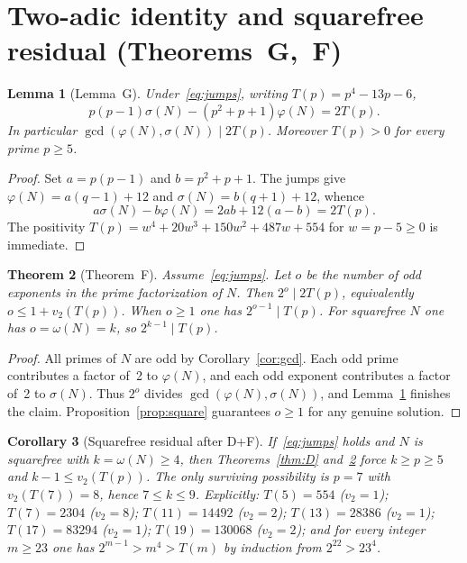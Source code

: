 \documentclass[11pt,reqno]{amsart}
\newcommand{\ph}{\varphi}
\newcommand{\sig}{\sigma}
\newtheorem{theorem}{Theorem}
\newtheorem{lemma}[theorem]{Lemma}
\newtheorem{corollary}[theorem]{Corollary}
\theoremstyle{definition}
\begin{document}
\section{Two-adic identity and squarefree residual (Theorems~G,~F)}
\label{sec:thmF}

\begin{lemma}[Lemma~G]
\label{lem:G}
Under~\eqref{eq:jumps}, writing \(T(p)=p^4-13p-6\),
\[
p(p-1)\sig(N)-(p^2+p+1)\ph(N)=2T(p).
\]
In particular \(\gcd(\ph(N),\sig(N))\mid 2T(p)\). Moreover \(T(p)>0\) for every prime \(p\ge 5\).
\end{lemma}

\begin{proof}
Set \(a=p(p-1)\) and \(b=p^2+p+1\). The jumps give \(\ph(N)=a(q-1)+12\) and \(\sig(N)=b(q+1)+12\), whence
\[
a\sig(N)-b\ph(N)=2ab+12(a-b)=2T(p).
\]
The positivity \(T(p)=w^4+20w^3+150w^2+487w+554\) for \(w=p-5\ge 0\) is immediate.
\end{proof}

\begin{theorem}[Theorem~F]
\label{thm:F}
Assume~\eqref{eq:jumps}. Let \(o\) be the number of odd exponents in the prime factorization of \(N\). Then \(2^o\mid 2T(p)\), equivalently \(o\le 1+v_2(T(p))\). When \(o\ge 1\) one has \(2^{o-1}\mid T(p)\). For squarefree \(N\) one has \(o=\omega(N)=k\), so \(2^{k-1}\mid T(p)\).
\end{theorem}

\begin{proof}
All primes of \(N\) are odd by Corollary~\ref{cor:gcd}. Each odd prime contributes a factor of~2 to \(\ph(N)\), and each odd exponent contributes a factor of~2 to \(\sig(N)\). Thus \(2^o\) divides \(\gcd(\ph(N),\sig(N))\), and Lemma~\ref{lem:G} finishes the claim. Proposition~\ref{prop:square} guarantees \(o\ge 1\) for any genuine solution.
\end{proof}

\begin{corollary}[Squarefree residual after D+F]
\label{cor:F1}
If~\eqref{eq:jumps} holds and \(N\) is squarefree with \(k=\omega(N)\ge 4\), then Theorems~\ref{thm:D} and~\ref{thm:F} force \(k\ge p\ge 5\) and \(k-1\le v_2(T(p))\). The only surviving possibility is \(p=7\) with \(v_2(T(7))=8\), hence \(7\le k\le 9\). Explicitly: \(T(5)=554\) (\(v_2=1\)); \(T(7)=2304\) (\(v_2=8\)); \(T(11)=14492\) (\(v_2=2\)); \(T(13)=28386\) (\(v_2=1\)); \(T(17)=83294\) (\(v_2=1\)); \(T(19)=130068\) (\(v_2=2\)); and for every integer \(m\ge 23\) one has \(2^{m-1}>m^4>T(m)\) by induction from \(2^{22}>23^4\).
\end{corollary}
\end{document}
